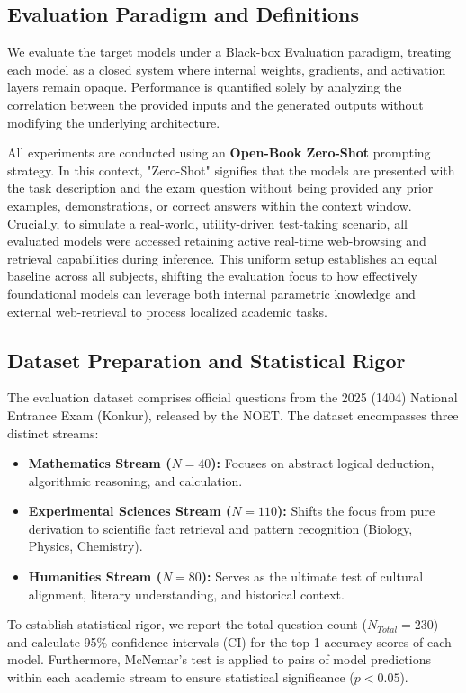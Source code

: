 \documentclass[twoside]{article}
\begin{document}
\subsection{Evaluation Paradigm and Definitions}
We evaluate the target models under a Black-box Evaluation paradigm, treating each model as a closed system where internal weights, gradients, and activation layers remain opaque. Performance is quantified solely by analyzing the correlation between the provided inputs and the generated outputs without modifying the underlying architecture.

All experiments are conducted using an \textbf{Open-Book Zero-Shot} prompting strategy. In this context, "Zero-Shot" signifies that the models are presented with the task description and the exam question without being provided any prior examples, demonstrations, or correct answers within the context window. Crucially, to simulate a real-world, utility-driven test-taking scenario, all evaluated models were accessed retaining active real-time web-browsing and retrieval capabilities during inference. This uniform setup establishes an equal baseline across all subjects, shifting the evaluation focus to how effectively foundational models can leverage both internal parametric knowledge and external web-retrieval to process localized academic tasks.

\subsection{Dataset Preparation and Statistical Rigor}
The evaluation dataset comprises official questions from the 2025 (1404) National Entrance Exam (Konkur), released by the NOET. The dataset encompasses three distinct streams:
\begin{itemize}
    \setlength{\itemsep}{0pt} %
    \setlength{\parskip}{0pt}
    \item \textbf{Mathematics Stream ($N = 40$):} Focuses on abstract logical deduction, algorithmic reasoning, and calculation.
    \item \textbf{Experimental Sciences Stream ($N = 110$):} Shifts the focus from pure derivation to scientific fact retrieval and pattern recognition (Biology, Physics, Chemistry).
    \item \textbf{Humanities Stream ($N = 80$):} Serves as the ultimate test of cultural alignment, literary understanding, and historical context.
\end{itemize}
To establish statistical rigor, we report the total question count ($N_{Total} = 230$) and calculate 95\% confidence intervals (CI) for the top-1 accuracy scores of each model. Furthermore, McNemar’s test is applied to pairs of model predictions within each academic stream to ensure statistical significance ($p < 0.05$).
\end{document}

